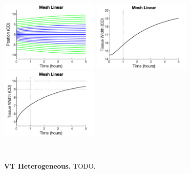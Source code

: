 \documentclass[12pt]{article}
\begin{document}
\begin{figure}[h]
%
\begin{center}
\includegraphics[width=4.9cm, trim={0.0cm 0.0cm 0.0cm 0.0cm}, clip]{Figs/Test02aMonolayerGrowth1dChainHeterogeneousChainMesh_Linear.png}
\includegraphics[width=4.9cm, trim={0.0cm 0.0cm 0.0cm 0.0cm}, clip]{Figs/Test02aMonolayerGrowth1dChainHeterogeneousChainMesh_LinearWidth}
\includegraphics[width=4.9cm, trim={0.0cm 0.0cm 0.0cm 0.0cm}, clip]{Figs/Test02aMonolayerGrowth1dChainHeterogeneousChainMesh_LinearInnerWidth}
\end{center}\
\vspace{-0.5cm}
\caption{{\bf VT Heterogeneous.} 
	TODO. }
\label{fig:todo}
\end{figure}
\end{document}
